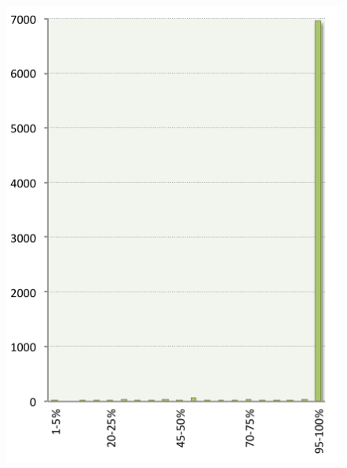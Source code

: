 \begin{figure}
      \begin{minipage}{0.5\textwidth}
      \includegraphics[width=\textwidth]{./img/protein_annot_distibA.png}
      \subcaption{}\label{figannotdistibA}
      \end{minipage}
      \begin{minipage}{0.5\textwidth}

\end{minipage}
\end{figure}
